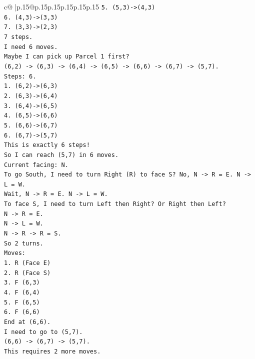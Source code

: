 \documentclass{article}
\begin{document}
{\begin{supertabular}{c@{$\;$}|p{.15\linewidth}@{}p{.15\linewidth}p{.15\linewidth}p{.15\linewidth}p{.15\linewidth}p{.15\linewidth}}
{{{\texttt{5. (5,3){-}>(4,3)} \\
\texttt{6. (4,3){-}>(3,3)} \\
\texttt{7. (3,3){-}>(2,3)} \\
\texttt{7 steps.} \\
\texttt{I need 6 moves.} \\
\texttt{Maybe I can pick up Parcel 1 first?} \\
\texttt{(6,2) {-}> (6,3) {-}> (6,4) {-}> (6,5) {-}> (6,6) {-}> (6,7) {-}> (5,7).} \\
\texttt{Steps: 6.} \\
\texttt{1. (6,2){-}>(6,3)} \\
\texttt{2. (6,3){-}>(6,4)} \\
\texttt{3. (6,4){-}>(6,5)} \\
\texttt{4. (6,5){-}>(6,6)} \\
\texttt{5. (6,6){-}>(6,7)} \\
\texttt{6. (6,7){-}>(5,7)} \\
\texttt{This is exactly 6 steps!} \\
\texttt{So I can reach (5,7) in 6 moves.} \\
\texttt{Current facing: N.} \\
\texttt{To go South, I need to turn Right (R) to face S? No, N {-}> R = E. N {-}> L = W.} \\
\texttt{Wait, N {-}> R = E. N {-}> L = W.} \\
\texttt{To face S, I need to turn Left then Right? Or Right then Left?} \\
\texttt{N {-}> R = E.} \\
\texttt{N {-}> L = W.} \\
\texttt{N {-}> R {-}> R = S.} \\
\texttt{So 2 turns.} \\
\texttt{Moves:} \\
\texttt{1. R (Face E)} \\
\texttt{2. R (Face S)} \\
\texttt{3. F (6,3)} \\
\texttt{4. F (6,4)} \\
\texttt{5. F (6,5)} \\
\texttt{6. F (6,6)} \\
\texttt{End at (6,6).} \\
\texttt{I need to go to (5,7).} \\
\texttt{(6,6) {-}> (6,7) {-}> (5,7).} \\
\texttt{This requires 2 more moves.} \\
}}}
\end{supertabular}}
\end{document}
